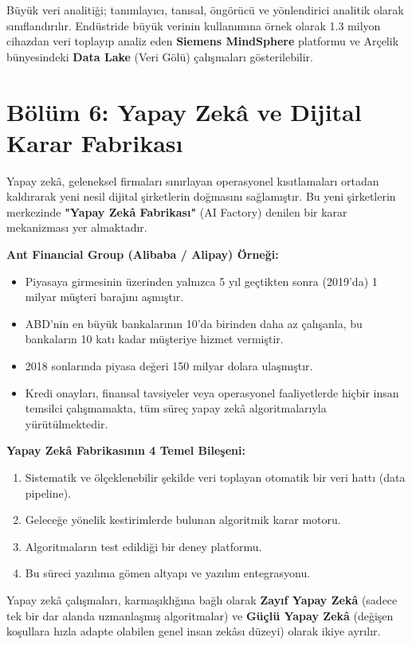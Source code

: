 \documentclass[11pt,a4paper,openany]{book}
\begin{document}
Büyük veri analitiği; tanımlayıcı, tanısal, öngörücü ve yönlendirici analitik olarak sınıflandırılır. Endüstride büyük verinin kullanımına örnek olarak 1.3 milyon cihazdan veri toplayıp analiz eden \textbf{Siemens MindSphere} platformu ve Arçelik bünyesindeki \textbf{Data Lake} (Veri Gölü) çalışmaları gösterilebilir.

\needspace{9cm}
\section{Bölüm 6: Yapay Zekâ ve Dijital Karar Fabrikası}
Yapay zekâ, geleneksel firmaları sınırlayan operasyonel kısıtlamaları ortadan kaldırarak yeni nesil dijital şirketlerin doğmasını sağlamıştır. Bu yeni şirketlerin merkezinde \textbf{"Yapay Zekâ Fabrikası"} (AI Factory) denilen bir karar mekanizması yer almaktadır.

\textbf{Ant Financial Group (Alibaba / Alipay) Örneği:}
\begin{itemize}
    \item Piyasaya girmesinin üzerinden yalnızca 5 yıl geçtikten sonra (2019'da) 1 milyar müşteri barajını aşmıştır.
    \item ABD'nin en büyük bankalarının 10'da birinden daha az çalışanla, bu bankaların 10 katı kadar müşteriye hizmet vermiştir.
    \item 2018 sonlarında piyasa değeri 150 milyar dolara ulaşmıştır.
    \item Kredi onayları, finansal tavsiyeler veya operasyonel faaliyetlerde hiçbir insan temsilci çalışmamakta, tüm süreç yapay zekâ algoritmalarıyla yürütülmektedir.
\end{itemize}

\textbf{Yapay Zekâ Fabrikasının 4 Temel Bileşeni:}
\begin{enumerate}
    \item Sistematik ve ölçeklenebilir şekilde veri toplayan otomatik bir veri hattı (data pipeline).
    \item Geleceğe yönelik kestirimlerde bulunan algoritmik karar motoru.
    \item Algoritmaların test edildiği bir deney platformu.
    \item Bu süreci yazılıma gömen altyapı ve yazılım entegrasyonu.
\end{enumerate}

Yapay zekâ çalışmaları, karmaşıklığına bağlı olarak \textbf{Zayıf Yapay Zekâ} (sadece tek bir dar alanda uzmanlaşmış algoritmalar) ve \textbf{Güçlü Yapay Zekâ} (değişen koşullara hızla adapte olabilen genel insan zekâsı düzeyi) olarak ikiye ayrılır.
\end{document}
